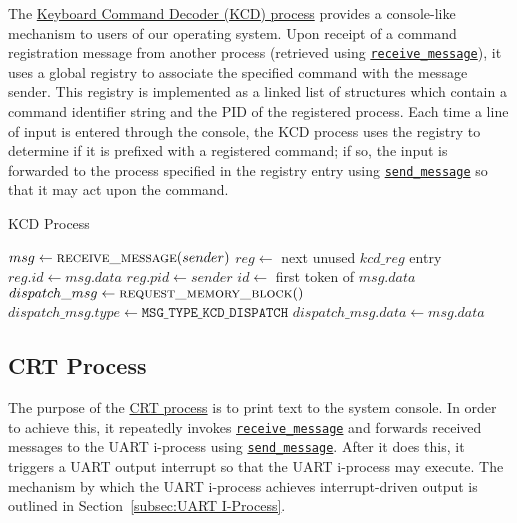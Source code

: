 \documentclass[12pt]{report}
\begin{document}
The \hyperref[alg:kcdprocess]{Keyboard Command Decoder (KCD) process} provides a console-like mechanism to users of our operating system. Upon receipt of a command registration message from another process (retrieved using \hyperref[alg:receivingmessages]{\texttt{receive_message}}), it uses a global registry to associate the specified command with the message sender. This registry is implemented as a linked list of structures which contain a command identifier string and the PID of the registered process. Each time a line of input is entered through the console, the KCD process uses the registry to determine if it is prefixed with a registered command; if so, the input is forwarded to the process specified in the registry entry using \hyperref[alg:sendingmessages]{\texttt{send_message}} so that it may act upon the command.\\

\begin{algorithm}
\caption{KCD Process}
\label{alg:kcdprocess}
\begin{algorithmic}[1]
        \State $msg \leftarrow \Call{receive\_message}{sender}$
            \State $reg \leftarrow$ next unused $kcd\_reg$ entry
            \State $reg.id \leftarrow msg.data$
            \State $reg.pid \leftarrow sender$
            \State $id \leftarrow$ first token of $msg.data$
                \State $dispatch\_msg \leftarrow \Call{request\_memory\_block}{\null}$
                \State $dispatch\_msg.type \leftarrow \texttt{MSG_TYPE_KCD_DISPATCH}$
                \State $dispatch\_msg.data \leftarrow msg.data$
                \State {}
            \EndIf
        \EndIf
        \State {}
    \EndWhile
\EndProcedure
\end{algorithmic}
\end{algorithm}

\subsection{CRT Process}

The purpose of the \hyperref[alg:crtprocess]{CRT process} is to print text to the system console. In order to achieve this, it repeatedly invokes \hyperref[alg:receivingmessages]{\texttt{receive_message}} and forwards received messages to the UART i-process using \hyperref[alg:sendingmessages]{\texttt{send_message}}. After it does this, it triggers a UART output interrupt so that the UART i-process may execute. The mechanism by which the UART i-process achieves interrupt-driven output is outlined in Section~\ref{subsec:UART I-Process}.\\
\end{document}
